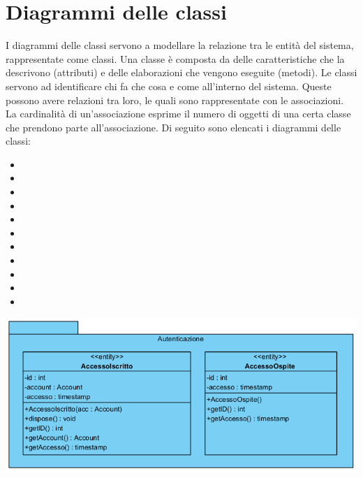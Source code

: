 \section{Diagrammi delle classi}  \label{cha:classi}
I diagrammi delle classi servono a modellare la relazione tra le entità del sistema, rappresentate come classi.
Una classe è composta da delle caratteristiche che la descrivono (attributi) e delle elaborazioni che vengono eseguite (metodi). 
Le classi servono ad identificare chi fa che cosa e come all’interno del sistema. Queste possono avere relazioni tra loro, le quali sono rappresentate con le associazioni. La cardinalità di un’associazione esprime il numero di oggetti di una certa classe che prendono parte all’associazione. Di seguito sono elencati i diagrammi delle classi:
\begin{itemize}
	\item {}
	\item {}
	\item {}
	\item {}
	\item {}
	\item {}
	\item {}
	\item {}
	\item {}
	\item {}
	\item {}
\end{itemize}


\begin{center}
			\includegraphics[width=\textwidth]{assets/visualParadigm/classi/Autenticazione}
\end{center}

